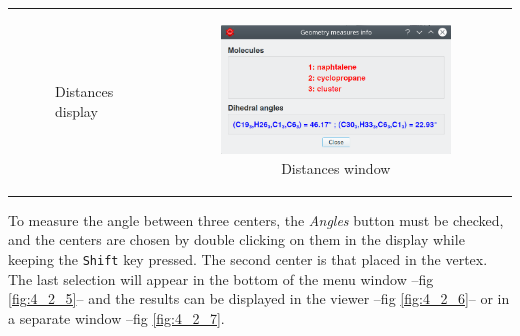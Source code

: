 \documentclass[10pt]{article}
\begin{document}
\begin{tabular}{lcr}
\begin{minipage}{.45\linewidth}
\begin{figure}[H]
\begin{center}
        \end{center}
        \vspace*{-2mm}
        \caption{Distances display \label{fig:4_2_3}}
    \end{figure}
\end{minipage}
&
\begin{minipage}{.25\linewidth}
    \begin{figure}[H]
        \begin{center}
            \vspace*{0mm}
            \includegraphics[width=0.9\linewidth]{damqt320_distances_3.png}
        \end{center}
        \vspace*{16mm}
        \caption{Distances window \label{fig:4_2_4}}
    \end{figure}
\end{minipage}
\end{tabular}
\vspace*{5mm}

To measure the angle between three centers, the {\it Angles} 
button must be checked, and the centers are chosen by double 
clicking on them in the display while keeping the \texttt{Shift} key pressed. The second center is that placed in 
the vertex.
The last selection will appear in the bottom of the menu window --fig \ref{fig:4_2_5}-- and the results can be 
displayed in the viewer --fig \ref{fig:4_2_6}-- 
or in a separate window --fig \ref{fig:4_2_7}.

\vspace*{0.5cm}
\end{document}
